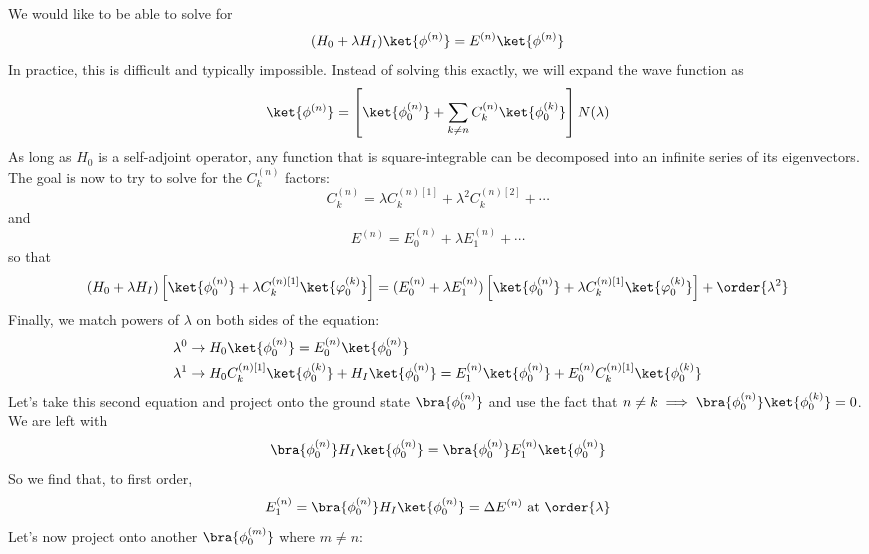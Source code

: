 \documentclass[a4paper,twoside,master.tex]{subfiles}
\begin{document}
We would like to be able to solve for
\begin{equation}
    (H_0 + \lambda H_I)\ket{\phi^{(n)}} = E^{(n)}\ket{\phi^{(n)}}
\end{equation}
In practice, this is difficult and typically impossible. Instead of solving this exactly, we will expand the wave function as
\begin{equation}
    \ket{\phi^{(n)}} = \left[\ket{\phi^{(n)}_0} + \sum_{k \neq n} C^{(n)}_{k}\ket{\phi^{(k)}_0} \right] N(\lambda)
\end{equation}
As long as $ H_0 $ is a self-adjoint operator, any function that is square-integrable can be decomposed into an infinite series of its eigenvectors. The goal is now to try to solve for the $ C^{(n)}_{k} $ factors:
\begin{equation}
    C_k^{(n)} = \lambda C^{(n)[1]}_k + \lambda^2 C_k^{(n)[2]} + \cdots
\end{equation}
and
\begin{equation}
    E^{(n)} = E^{(n)}_0 + \lambda E^{(n)}_1 + \cdots
\end{equation}
so that
\begin{equation}
    (H_0 + \lambda H_I)\left[\ket{\phi_0^{(n)}} + \lambda C_k^{(n)[1]}\ket{\varphi_0^{(k)}} \right] = (E_0^{(n)} + \lambda E_1^{(n)}) \left[ \ket{\phi_0^{(n)}} + \lambda C_k^{(n)[1]}\ket{\varphi_0^{(k)}} \right] + \order{\lambda^2}
\end{equation}
Finally, we match powers of $\lambda$ on both sides of the equation:
\begin{align}
    \lambda^0 &\to H_0\ket{\phi_0^{(n)}} = E_0^{(n)}\ket{\phi_0^{(n)}} \\
    \lambda^1 &\to H_0 C_k^{(n)[1]}\ket{\phi_0^{(k)}} + H_I\ket{\phi_0^{(n)}} = E_1^{(n)}\ket{\phi_0^{(n)}} + E_0^{(n)} C_k^{(n)[1]}\ket{\phi_0^{(k)}}
\end{align}
Let's take this second equation and project onto the ground state $\bra{\phi_0^{(n)}} $ and use the fact that $ n\neq k \implies\bra{\phi_0^{(n)}}\ket{\phi_0^{(k)}} = 0 $. We are left with
\begin{equation}
    \bra{\phi_0^{(n)}} H_I\ket{\phi_0^{(n)}} =\bra{\phi_0^{(n)}} E_1^{(n)}\ket{\phi_0^{(n)}}
\end{equation}
So we find that, to first order,
\begin{equation}
    E_1^{(n)} = \bra{\phi_0^{(n)}} H_I\ket{\phi_0^{(n)}} = \Delta E^{(n)} \text{ at } \order{\lambda}
\end{equation}
Let's now project onto another $\bra{\phi_0^{(m)}} $ where $ m \neq n $:
\end{document}
